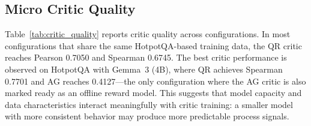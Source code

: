 \documentclass[12pt,a4paper]{article}
\begin{document}
\begin{table}[H]
\centering
\caption{Selected fixed workflow and critic-deployment results.}
\label{tab:fixed_workflow_comparison}
\end{table}

\subsection{Micro Critic Quality}

Table~\ref{tab:critic_quality} reports critic quality across configurations. In most configurations that share the same HotpotQA-based training data, the QR critic reaches Pearson 0.7050 and Spearman 0.6745. The best critic performance is observed on HotpotQA with Gemma~3 (4B), where QR achieves Spearman 0.7701 and AG reaches 0.4127---the only configuration where the AG critic is also marked ready as an offline reward model. This suggests that model capacity and data characteristics interact meaningfully with critic training: a smaller model with more consistent behavior may produce more predictable process signals.
\end{document}
